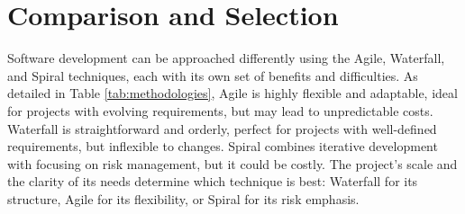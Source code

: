 \section{Comparison and Selection}
Software development can be approached differently using the Agile, Waterfall, and Spiral techniques, each with its own set of benefits and difficulties.
As detailed in Table \ref{tab:methodologies}, Agile is highly flexible and adaptable, ideal for projects with evolving requirements, but may lead to unpredictable costs.
Waterfall is straightforward and orderly, perfect for projects with well-defined requirements, but inflexible to changes.
Spiral combines iterative development with focusing on risk management, but it could be costly. 
\newpage
The project's scale and the clarity of its needs determine which technique is best: Waterfall for its structure, Agile for its flexibility, or Spiral for its risk emphasis.
